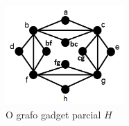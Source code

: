 \begin{figure}[htb]	
\center%
\includegraphics[width=4.5cm]{./img/gadgetBase.png}
\caption{O grafo gadget parcial $H$}
\label{fig:gadgetBase}
\end{figure}